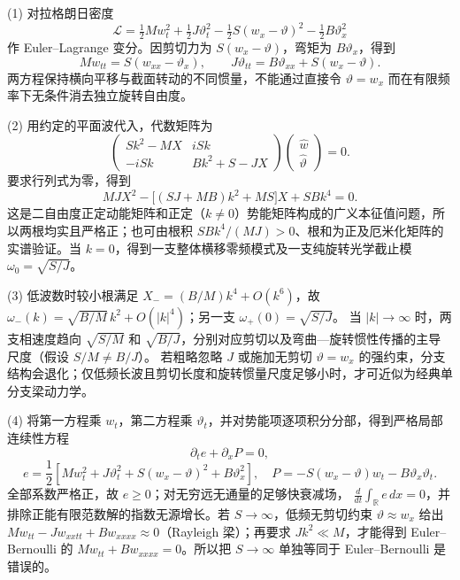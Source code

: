 (1) 对拉格朗日密度
\[
\mathscr L=\tfrac12 Mw_t^2+\tfrac12J\vartheta_t^2
-\tfrac12 S(w_x-\vartheta)^2-\tfrac12 B\vartheta_x^2
\]
作 Euler--Lagrange 变分。因剪切力为 \(S(w_x-\vartheta)\)，弯矩为 \(B\vartheta_x\)，得到
\[
M w_{tt}=S(w_{xx}-\vartheta_x),\qquad
J\vartheta_{tt}=B\vartheta_{xx}+S(w_x-\vartheta).
\]
两方程保持横向平移与截面转动的不同惯量，不能通过直接令 \(\vartheta=w_x\) 而在有限频率下无条件消去独立旋转自由度。

(2) 用约定的平面波代入，代数矩阵为
\[
\begin{pmatrix}Sk^2-MX&iSk\\-iSk&Bk^2+S-JX\end{pmatrix}
\begin{pmatrix}\widehat w\\ \widehat\vartheta\end{pmatrix}=0.
\]
要求行列式为零，得到
\[
MJX^2-\big[(SJ+MB)k^2+MS\big]X+SBk^4=0.
\]
这是二自由度正定动能矩阵和正定（\(k\ne0\)）势能矩阵构成的广义本征值问题，所以两根均实且严格正；也可由根积 \(SBk^4/(MJ)>0\)、根和为正及厄米化矩阵的实谱验证。当 \(k=0\)，得到一支整体横移零频模式及一支纯旋转光学截止模 \(\omega_0=\sqrt{S/J}\)。

(3) 低波数时较小根满足
\(X_-=({B}/{M})k^4+O(k^6)\)，故
\(\omega_-(k)=\sqrt{B/M}\,k^2+O(|k|^4)\)；另一支
\(\omega_+(0)=\sqrt{S/J}\)。
当 \(|k|\to\infty\) 时，两支相速度趋向
\(\sqrt{S/M}\) 和 \(\sqrt{B/J}\)，分别对应剪切以及弯曲—旋转惯性传播的主导尺度（假设 \(S/M\ne B/J\)）。
若粗略忽略 \(J\) 或施加无剪切 \(\vartheta=w_x\) 的强约束，分支结构会退化；仅低频长波且剪切长度和旋转惯量尺度足够小时，才可近似为经典单分支梁动力学。

(4) 将第一方程乘 \(w_t\)，第二方程乘 \(\vartheta_t\)，并对势能项逐项积分分部，得到严格局部连续性方程
\[
\partial_t e+\partial_x P=0,
\]
\[
e=\frac12[Mw_t^2+J\vartheta_t^2+S(w_x-\vartheta)^2+B\vartheta_x^2],
\quad
P=-S(w_x-\vartheta)w_t-B\vartheta_x\vartheta_t .
\]
全部系数严格正，故 \(e\ge0\)；对无穷远无通量的足够快衰减场，
\(\frac{d}{dt}\int_{\mathbb R}e\,dx=0\)，并排除正能有限范数解的指数无源增长。若 \(S\to\infty\)，低频无剪切约束 \(\vartheta\approx w_x\) 给出
\(Mw_{tt}-Jw_{xxtt}+Bw_{xxxx}\approx0\)（Rayleigh 梁）；再要求
\(Jk^2\ll M\)，才能得到 Euler--Bernoulli 的
\(Mw_{tt}+Bw_{xxxx}=0\)。所以把 \(S\to\infty\) 单独等同于 Euler--Bernoulli 是错误的。
